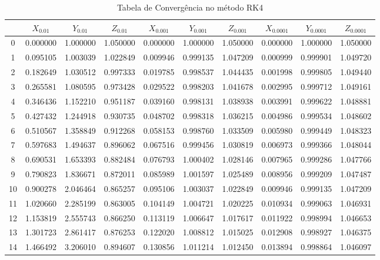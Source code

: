 \documentclass[12pt, a4paper]{article}
\begin{document}
    
    \begin{table}[H]
    \centering
    \footnotesize %
        \begin{tabular}{|c|c|c|c|c|c|c|c|c|c|}
        \toprule
         & $X_{0.01}$ & $Y_{0.01}$ & $Z_{0.01}$ & $X_{0.001}$ & $Y_{0.001}$ & $Z_{0.001}$ & $X_{0.0001}$ & $Y_{0.0001}$ & $Z_{0.0001}$ \\
        \midrule
        0 & 0.000000 & 1.000000 & 1.050000 & 0.000000 & 1.000000 & 1.050000 & 0.000000 & 1.000000 & 1.050000 \\
        1 & 0.095105 & 1.003039 & 1.022849 & 0.009946 & 0.999135 & 1.047209 & 0.000999 & 0.999901 & 1.049720 \\
        2 & 0.182649 & 1.030512 & 0.997333 & 0.019785 & 0.998537 & 1.044435 & 0.001998 & 0.999805 & 1.049440 \\
        3 & 0.265581 & 1.080595 & 0.973428 & 0.029522 & 0.998203 & 1.041678 & 0.002995 & 0.999712 & 1.049161 \\
        4 & 0.346436 & 1.152210 & 0.951187 & 0.039160 & 0.998131 & 1.038938 & 0.003991 & 0.999622 & 1.048881 \\
        5 & 0.427432 & 1.244918 & 0.930735 & 0.048702 & 0.998318 & 1.036215 & 0.004986 & 0.999534 & 1.048602 \\
        6 & 0.510567 & 1.358849 & 0.912268 & 0.058153 & 0.998760 & 1.033509 & 0.005980 & 0.999449 & 1.048323 \\
        7 & 0.597683 & 1.494637 & 0.896062 & 0.067516 & 0.999456 & 1.030819 & 0.006973 & 0.999366 & 1.048044 \\
        8 & 0.690531 & 1.653393 & 0.882484 & 0.076793 & 1.000402 & 1.028146 & 0.007965 & 0.999286 & 1.047766 \\
        9 & 0.790823 & 1.836671 & 0.872011 & 0.085989 & 1.001597 & 1.025489 & 0.008956 & 0.999209 & 1.047487 \\
        10 & 0.900278 & 2.046464 & 0.865257 & 0.095106 & 1.003037 & 1.022849 & 0.009946 & 0.999135 & 1.047209 \\
        11 & 1.020660 & 2.285199 & 0.863005 & 0.104149 & 1.004721 & 1.020225 & 0.010934 & 0.999063 & 1.046931 \\
        12 & 1.153819 & 2.555743 & 0.866250 & 0.113119 & 1.006647 & 1.017617 & 0.011922 & 0.998994 & 1.046653 \\
        13 & 1.301723 & 2.861417 & 0.876253 & 0.122020 & 1.008812 & 1.015025 & 0.012908 & 0.998927 & 1.046375 \\
        14 & 1.466492 & 3.206010 & 0.894607 & 0.130856 & 1.011214 & 1.012450 & 0.013894 & 0.998864 & 1.046097 \\
        \bottomrule
        \end{tabular}
        \caption{Tabela de Convergência no método RK4}
        \end{table}
    
\end{document}
